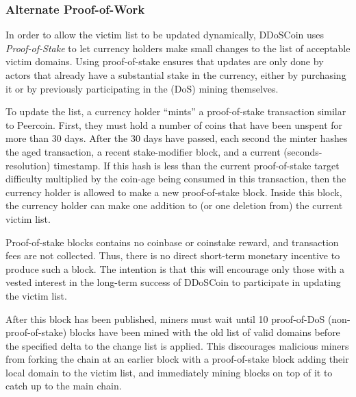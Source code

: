 \subsubsection{Alternate Proof-of-Work}

In order to allow the victim list to be updated dynamically, DDoSCoin uses
\emph{Proof-of-Stake} to let currency holders make small changes to the list of
acceptable victim domains. Using proof-of-stake ensures that updates are only
done by actors that already have a substantial stake in the currency, either by
purchasing it or by previously participating in the (DoS) mining themselves.

To update the list, a currency holder ``mints'' a proof-of-stake transaction
similar to Peercoin. First, they must hold a number of coins that have been
unspent for more than 30 days. After the 30 days have passed, each second the
minter
hashes the aged transaction, a recent stake-modifier block, and a current
(seconds-resolution) timestamp. If this hash is less than the current
proof-of-stake target difficulty multiplied by the coin-age being consumed in
this transaction, then the currency holder is allowed to make a new
proof-of-stake block. Inside this block, the currency holder can make one
addition to (or one deletion from) the current victim list.

Proof-of-stake blocks contains no coinbase or coinstake reward, and transaction
fees are not collected. Thus, there is no direct short-term monetary incentive
to produce such a block. The intention is that this will encourage only those
with a vested interest in the long-term success of DDoSCoin to participate in
updating the victim list.

After this block has been published, miners must wait until 10 proof-of-DoS
(non-proof-of-stake) blocks have been mined with the old list of valid domains
before the specified delta to the change list is applied. This discourages
malicious miners from forking the chain at an earlier block with a
proof-of-stake block adding their local domain to the victim list, and
immediately mining blocks on top of it to catch up to the main chain.









